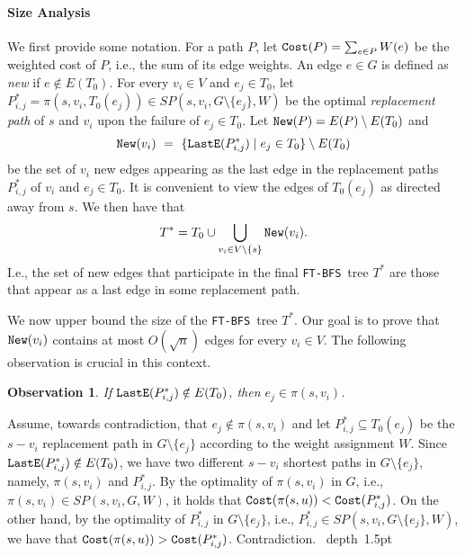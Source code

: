 \documentclass[12pt]{article}
\newtheorem{observation}[theorem]{Observation}
\def\Cost{\mbox{\tt Cost}}
\def\Proof{\par\noindent{\bf Proof:~}}
\def\blackslug{\hbox{\hskip 1pt \vrule width 4pt height 8pt
    depth 1.5pt \hskip 1pt}}
\def\QED{\quad\blackslug\lower 8.5pt\null\par}
\newcommand{\New}[0]{\mbox{\tt New}}
\def\LastE{\mbox{\tt LastE}}
\def\FTBFS{\mbox{\tt FT-BFS}}
\begin{document}
\paragraph{Size Analysis}
We first provide some notation.
For a path $P$, let $\Cost(P)=\sum_{e \in P} W(e)$ be the weighted cost of $P$, i.e., the sum of its edge weights.
An edge $e \in G$ is defined as \emph{new} if $e \notin E(T_0)$.
For every $v_i \in V$ and $e_j \in T_0$, let
$P^*_{i,j}=\pi(s, v_i, T_0(e_j)) \in SP(s, v_i, G \setminus \{e_j\}, W)$
be the optimal \emph{replacement path} of $s$ and $v_i$ upon
the failure of $e_j \in T_0$.
Let $\New(P)=E(P) \setminus E(T_0)$ and
$$\New(v_i) ~=~ \{\LastE(P^*_{i,j}) \mid e_j \in T_0\} \setminus E(T_0)$$
be the set of $v_i$ new edges appearing as the last edge in the replacement paths $P^{*}_{i,j}$ of $v_i$ and $e_j \in T_0$.
It is convenient to view the edges of $T_0(e_j)$ as directed away from $s$.
We then have that
$$T^{*}=T_0\cup \bigcup_{v_i \in V \setminus \{s\}} \New(v_i).$$
I.e., the set of new edges that participate in the final \FTBFS\ tree $T^{*}$
are those that appear as a last edge in some replacement path.
\par We now upper bound the size of the \FTBFS\ tree $T^{*}$.
Our goal is to prove that $\New(v_i)$ contains at most $O(\sqrt{n})$ edges for every $v_i \in V$.
The following observation is crucial in this context.
\begin{observation}
\label{obs:new_edge}
If $\LastE(P^*_{i,j})\notin E(T_0)$, then
$e_j \in \pi(s,v_i)$.
\end{observation}
\def\APPENDONENEWEDGE{
\Proof
Assume, towards contradiction, that $e_j \notin \pi(s,v_i)$ and let
$P^*_{i,j} \subseteq T_0(e_j)$ be the $s-v_i$ replacement path in
$G \setminus \{e_j\}$ according to the weight assignment $W$.
Since $\LastE(P^*_{i,j}) \notin E(T_0)$,
we have two different $s-v_i$ shortest paths in $G \setminus \{e_j\}$, namely,
$\pi(s,v_i)$ and
$P^*_{i,j}$. By the optimality of $\pi(s,v_i)$ in $G$, i.e.,
$\pi(s,v_i) \in SP(s, v_i, G, W)$,
it holds that $\Cost(\pi(s,u)) < \Cost(P^*_{i,j})$.
On the other hand, by the optimality of $P^*_{i,j}$ in $G \setminus \{e_j\}$, i.e.,
$P^*_{i,j} \in SP(s, v_i, G \setminus \{e_j\}, W)$, we have that
$\Cost(\pi(s,u))> \Cost(P^*_{i,j})$. Contradiction.
\QED
}\APPENDONENEWEDGE
\end{document}
